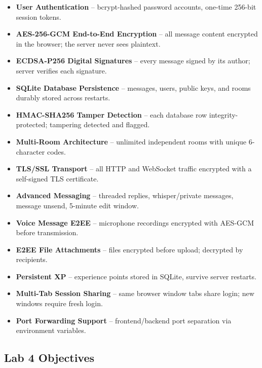 \documentclass[12pt, a4paper]{article}
\begin{document}
\begin{itemize}[leftmargin=*]
    \item \textbf{User Authentication} -- bcrypt-hashed password accounts, one-time 256-bit session tokens.
    \item \textbf{AES-256-GCM End-to-End Encryption} -- all message content encrypted in the browser; the server never sees plaintext.
    \item \textbf{ECDSA-P256 Digital Signatures} -- every message signed by its author; server verifies each signature.
    \item \textbf{SQLite Database Persistence} -- messages, users, public keys, and rooms durably stored across restarts.
    \item \textbf{HMAC-SHA256 Tamper Detection} -- each database row integrity-protected; tampering detected and flagged.
    \item \textbf{Multi-Room Architecture} -- unlimited independent rooms with unique 6-character codes.
    \item \textbf{TLS/SSL Transport} -- all HTTP and WebSocket traffic encrypted with a self-signed TLS certificate.
    \item \textbf{Advanced Messaging} -- threaded replies, whisper/private messages, message unsend, 5-minute edit window.
    \item \textbf{Voice Message E2EE} -- microphone recordings encrypted with AES-GCM before transmission.
    \item \textbf{E2EE File Attachments} -- files encrypted before upload; decrypted by recipients.
    \item \textbf{Persistent XP} -- experience points stored in SQLite, survive server restarts.
    \item \textbf{Multi-Tab Session Sharing} -- same browser window tabs share login; new windows require fresh login.
    \item \textbf{Port Forwarding Support} -- frontend/backend port separation via environment variables.
\end{itemize}

\subsection{Lab 4 Objectives}
\end{document}
